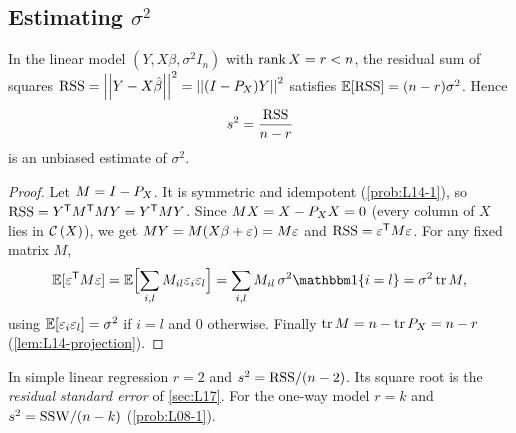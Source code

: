 \subsection{Estimating $\sigma^2$}
\begin{theorem}\label{thm:L16-s2}
In the linear model $(Y,X\beta,\sigma^2I_n)$ with $\operatorname{rank} X=r<n$, the residual sum of squares
$\mathrm{RSS}=\left|\left|Y-X\hat\beta\right|\right|^2=\left|\left|(I-P_X)Y\right|\right|^2$ satisfies $\mathbb E[\mathrm{RSS}]=(n-r)\sigma^2$. Hence
\[
s^2=\frac{\mathrm{RSS}}{n-r}
\]
is an unbiased estimate of $\sigma^2$.
\end{theorem}
\begin{proof}
Let $M=I-P_X$. It is symmetric and idempotent (\cref{prob:L14-1}), so $\mathrm{RSS}=Y^{\mathsf T} M^{\mathsf T} MY=Y^{\mathsf T} MY$. Since
$MX=X-P_X X=0$ (every column of $X$ lies in $\mathcal{C}\left(X\right)$), we get $MY=M(X\beta+\varepsilon)=M\varepsilon$ and $\mathrm{RSS}=\varepsilon^{\mathsf T} M\varepsilon$. For any fixed matrix $M$,
\[
\EE[\eps\T M\eps]=\EE\Bigl[\sum_{i,l}M_{il}\eps_i\eps_l\Bigr]=\sum_{i,l}M_{il}\,\sigma^2\mathbbm 1\{i=l\}=\sigma^2\tr M ,
\]
using $\mathbb E[\varepsilon_i\varepsilon_l]=\sigma^2$ if $i=l$ and $0$ otherwise. Finally
$\operatorname{tr} M=n-\operatorname{tr}P_X=n-r$ (\cref{lem:L14-projection}).
\end{proof}
In simple linear regression $r=2$ and $s^2=\mathrm{RSS}/(n-2)$. Its square root is the \emph{residual standard
error} of \cref{sec:L17}. For the one-way model $r=k$ and $s^2=\mathrm{SSW}/(n-k)$ (\cref{prob:L08-1}).


